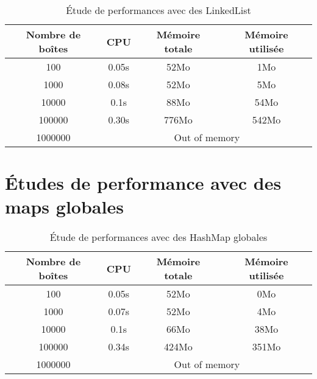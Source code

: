 \begin{table}[htbp]
  \centering
\begin{tabular}{|c|c|c|c|}
\hline
Nombre de boîtes & CPU & Mémoire totale & Mémoire utilisée\\
\hline
100 & 0.05s & 52Mo & 1Mo\\
\hline
1000 & 0.08s & 52Mo & 5Mo\\
\hline
10000 & 0.1s & 88Mo & 54Mo\\
\hline
100000 & 0.30s & 776Mo & 542Mo\\
\hline
1000000 & \multicolumn{3}{|c|}{Out of memory}\\
\hline
\end{tabular}
\caption{Étude de performances avec des LinkedList}
\label{tab:linkedlist}
\end{table}
\clearpage




\section{Études de performance avec des maps globales}
\begin{table}[h]
  \centering
\begin{tabular}{|c|c|c|c|}
\hline
Nombre de boîtes & CPU & Mémoire totale & Mémoire utilisée\\
\hline
100 & 0.05s & 52Mo & 0Mo\\
\hline
1000 & 0.07s & 52Mo & 4Mo\\
\hline
10000 & 0.1s & 66Mo & 38Mo\\
\hline
100000 & 0.34s & 424Mo & 351Mo\\
\hline
1000000 & \multicolumn{3}{|c|}{Out of memory}\\
\hline
\end{tabular}
\caption{Étude de performances avec des HashMap globales} 
\label{tab:hashmapglobal}
\end{table}











